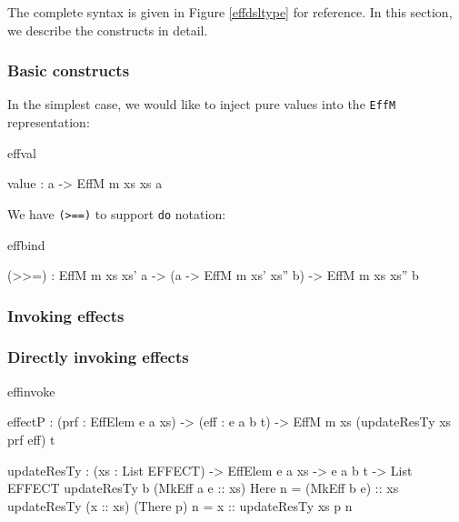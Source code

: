 \noindent
The complete syntax is given in Figure \ref{effdsltype} for reference. In this
section, we describe the constructs in detail.

\subsubsection{Basic constructs}

In the simplest case, we would like to inject pure values into the
\texttt{EffM} representation:

\begin{SaveVerbatim}{effval}

value : a -> EffM m xs xs a

\end{SaveVerbatim}

We have \texttt{(>==)} to support \texttt{do} notation:

\begin{SaveVerbatim}{effbind}

(>>=) : EffM m xs xs' a -> 
        (a -> EffM m xs' xs'' b) -> EffM m xs xs'' b

\end{SaveVerbatim}

\subsubsection{Invoking effects}

\subsubsection*{Directly invoking effects}

\begin{SaveVerbatim}{effinvoke}

effectP : (prf : EffElem e a xs) -> (eff : e a b t) -> 
          EffM m xs (updateResTy xs prf eff) t

\end{SaveVerbatim}

\begin{SaveVerbatim}{}

updateResTy : (xs : List EFFECT) -> 
              EffElem e a xs -> e a b t -> List EFFECT
updateResTy {b} (MkEff a e :: xs) Here      n 
                 = (MkEff b e) :: xs
updateResTy     (x :: xs)         (There p) n 
                 = x :: updateResTy xs p n

\end{SaveVerbatim}
\useverb{}

